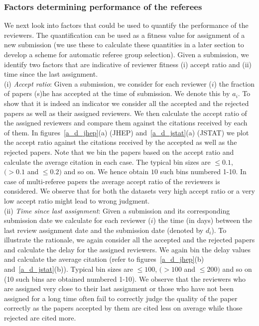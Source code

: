 \subsubsection{Factors determining performance of the referees}
We next look into factors that could be used to quantify the performance of the reviewers. The quantification can be used as a 
fitness value for assignment of a new submission (we use these to calculate these quantities in a later section to develop a scheme for automatic referee group selection). 
Given a submission, we identify two factors that are indicative of reviewer fitness (i) accept ratio and (ii) time since the last assignment.\\
\noindent(i) \textit{Accept ratio}: Given a submission, we consider for each reviewer ($i$) the fraction of papers (s)he has accepted at the time of submission. 
We denote this by $a_i$. To show that it is indeed an indicator we consider all the accepted and the rejected papers as well as their assigned reviewers. 
We then calculate the accept ratio of the assigned reviewers and compare them against the citations received by each of them. 
In figures~\ref{a_d_jhep}(a) (JHEP) and~\ref{a_d_jstat}(a) (JSTAT) we plot the accept ratio against the citations received by the accepted as well as the rejected papers. 
Note that we bin the papers based on the accept ratio and calculate the average citation in each case. The typical bin sizes are $\leq 0.1$, $(> 0.1$ and $\leq 0.2)$ and so on. 
We hence obtain $10$ such bins numbered 1-10. 
In case of multi-referee papers the average accept ratio of the reviewers is considered. We observe that for both the datasets very high accept ratio or a very low accept 
ratio might lead to wrong judgment. \\ 
\noindent(ii) \textit{Time since last assignment}: Given a submission and its corresponding submission date we calculate for each reviewer ($i$) the time (in days) between the 
last review assignment date and the submission date (denoted by $d_i$). To illustrate the rationale, we again consider all the accepted and the rejected papers and calculate 
the delay for the assigned reviewers. We again bin the delay values and calculate the average citation (refer to figures~\ref{a_d_jhep}(b) and~\ref{a_d_jstat}(b)). Typical bin 
sizes are $\leq 100$, $(> 100$ and $\leq 200)$ and so on (10 such bins are obtained numbered 1-10). We observe that the reviewers who are assigned very close to their last 
assignment or those who have not been assigned for a long time often fail to correctly judge the quality of the paper correctly as the papers accepted by them are cited less 
on average while those rejected are cited more. 


